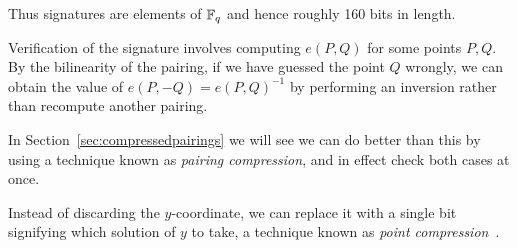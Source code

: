 Thus signatures are elements of $\mathbb{F}_q$ and hence roughly 160 bits in length.

Verification of the signature involves computing $e(P, Q)$ for some points
$P, Q$. By the bilinearity of the pairing, if we have guessed the point $Q$
wrongly, we can obtain the value of $e(P,-Q) = e(P,Q)^{-1}$ by performing
an inversion rather than recompute another pairing.

In Section~\ref{sec:compressedpairings} we will see we can do better
than this by using a technique known
as \emph{pairing compression}, and in effect check both
cases at once.

Instead of discarding the $y$-coordinate, we can
replace it with a single bit signifying which solution of $y$ to take,
a technique known as \emph{point compression}~\cite[Section IV.4]{bss}.
